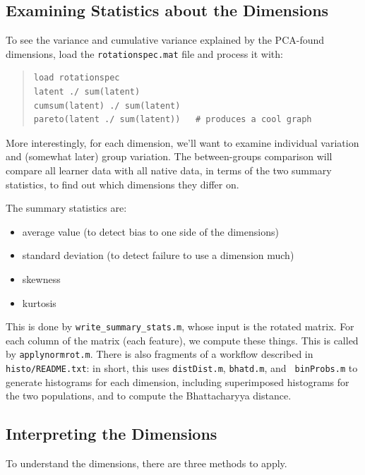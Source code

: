 \documentclass[11pt]{article}
\begin{document}
\subsection{Examining Statistics about the Dimensions}

To see the variance and cumulative variance explained by the PCA-found
dimensions, load the {\tt rotationspec.mat} file and process it with:

\begin{quote}
\begin{verbatim}
load rotationspec
latent ./ sum(latent) 
cumsum(latent) ./ sum(latent) 
pareto(latent ./ sum(latent))   # produces a cool graph
\end{verbatim}
\end{quote}

More interestingly, for each dimension, we'll want to examine
individual variation and (somewhat later) group variation.  The
between-groups comparison will compare all learner data with all
native data, in terms of the two summary statistics, to find out which
dimensions they differ on.

The summary statistics are:
\begin{itemize}   \setlength{\itemsep}{0pt}\setlength{\parskip}{0pt}
\item average value (to detect bias to one side of the dimensions)   
\item standard deviation (to detect failure to use a dimension much)
\item skewness
\item kurtosis
\end{itemize}

This is done by {\tt write\_summary\_stats.m}, whose input is the
rotated matrix.  For each column of the matrix (each feature), we
compute these things.  This is called by {\tt applynormrot.m}.  There
is also fragments of a workflow described in {\tt histo/README.txt}:
in short, this uses {\tt distDist.m}, {\tt bhatd.m}, and {\tt
  binProbs.m} to generate histograms for each dimension, including
superimposed histograms for the two populations, and to compute the
Bhattacharyya distance.


\subsection{Interpreting the Dimensions}

To understand the dimensions, there are three methods to apply.
\end{document}
